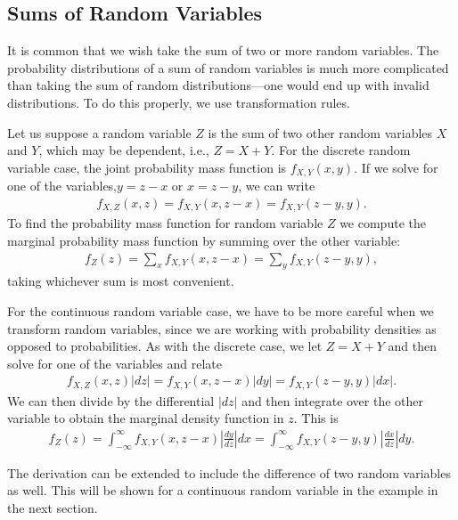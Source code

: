\subsection{Sums of Random Variables}

It is common that we wish take the sum of two or more random variables. The probability distributions of a sum of random variables is much more complicated than taking the sum of random distributions---one would end up with invalid distributions. To do this properly, we use transformation rules.

Let us suppose a random variable $Z$ is the sum of two other random variables $X$ and $Y$, which may be dependent, i.e., $Z = X + Y$. For the discrete random variable case, the joint probability mass function is $f_{X,Y}(x,y)$. If we solve for one of the variables,$y = z - x$ or $x = z - y$, we can write
\begin{align}
  f_{X,Z}(x,z) = f_{X,Y}(x,z-x) = f_{X,Y}(z-y,y) . \nonumber
\end{align}
To find the probability mass function for random variable $Z$ we compute the marginal probability mass function by summing over the other variable:
\begin{align}
  f_{Z}(z) = \sum_x f_{X,Y}(x,z-x) = \sum_y f_{X,Y}(z-y,y) , 
\end{align}
taking whichever sum is most convenient.

For the continuous random variable case, we have to be more careful when we transform random variables, since we are working with probability densities as opposed to probabilities. As with the discrete case, we let $Z = X + Y$ and then solve for one of the variables and relate
\begin{align}
  f_{X,Z}(x,z) |dz| = f_{X,Y}(x,z-x) |dy| = f_{X,Y}(z-y,y) |dx|. \nonumber
\end{align}
We can then divide by the differential $|dz|$ and then integrate over the other variable to obtain the marginal density function in $z$. This is
\begin{align}
  f_{Z}(z) = \int_{-\infty}^{\infty} f_{X,Y}(x,z-x) \left| \frac{dy}{dz} \right| dx = \int_{-\infty}^{\infty}  f_{X,Y}(z-y,y) \left| \frac{dx}{dz} \right| dy. 
\end{align}

The derivation can be extended to include the difference of two random variables as well. This will be shown for a continuous random variable in the example in the next section.


